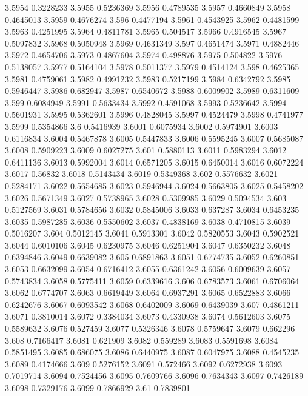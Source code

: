 3.5954  0.3228233
3.5955  0.5236369
3.5956  0.4789535
3.5957  0.4660849
3.5958  0.4645013
3.5959  0.4676274
3.596  0.4477194
3.5961  0.4543925
3.5962  0.4481599
3.5963  0.4251995
3.5964  0.4811781
3.5965  0.504517
3.5966  0.4916545
3.5967  0.5097832
3.5968  0.5050948
3.5969  0.4631349
3.597  0.4651474
3.5971  0.4882446
3.5972  0.4654706
3.5973  0.4867604
3.5974  0.498876
3.5975  0.504822
3.5976  0.5138057
3.5977  0.5164104
3.5978  0.5011377
3.5979  0.4514124
3.598  0.4625365
3.5981  0.4759061
3.5982  0.4991232
3.5983  0.5217199
3.5984  0.6342792
3.5985  0.5946447
3.5986  0.682947
3.5987  0.6540672
3.5988  0.6009902
3.5989  0.6311609
3.599  0.6084949
3.5991  0.5633434
3.5992  0.4591068
3.5993  0.5236642
3.5994  0.5601931
3.5995  0.5362601
3.5996  0.4828045
3.5997  0.4524479
3.5998  0.4741977
3.5999  0.5354866
3.6  0.5416939
3.6001  0.6075934
3.6002  0.5974901
3.6003  0.6116834
3.6004  0.5467878
3.6005  0.5447833
3.6006  0.5595245
3.6007  0.5685087
3.6008  0.5909223
3.6009  0.6027275
3.601  0.5880113
3.6011  0.5983294
3.6012  0.6411136
3.6013  0.5992004
3.6014  0.6571205
3.6015  0.6450014
3.6016  0.6072224
3.6017  0.56832
3.6018  0.5143434
3.6019  0.5349368
3.602  0.5576632
3.6021  0.5284171
3.6022  0.5654685
3.6023  0.5946944
3.6024  0.5663805
3.6025  0.5458202
3.6026  0.5671349
3.6027  0.5738965
3.6028  0.5309985
3.6029  0.5094534
3.603  0.5127569
3.6031  0.5784656
3.6032  0.5845006
3.6033  0.637287
3.6034  0.6453235
3.6035  0.5987285
3.6036  0.5550602
3.6037  0.4838169
3.6038  0.4710815
3.6039  0.5016207
3.604  0.5012145
3.6041  0.5913301
3.6042  0.5820553
3.6043  0.5902521
3.6044  0.6010106
3.6045  0.6230975
3.6046  0.6251904
3.6047  0.6350232
3.6048  0.6394846
3.6049  0.6639082
3.605  0.6891863
3.6051  0.6774735
3.6052  0.6260851
3.6053  0.6632099
3.6054  0.6716412
3.6055  0.6361242
3.6056  0.6009639
3.6057  0.5743834
3.6058  0.5775411
3.6059  0.6339616
3.606  0.6783573
3.6061  0.6706064
3.6062  0.6774707
3.6063  0.6619449
3.6064  0.6937291
3.6065  0.6522883
3.6066  0.6242676
3.6067  0.6093542
3.6068  0.6402009
3.6069  0.6439039
3.607  0.4861211
3.6071  0.3810014
3.6072  0.3384034
3.6073  0.4330938
3.6074  0.5612603
3.6075  0.5589632
3.6076  0.527459
3.6077  0.5326346
3.6078  0.5759647
3.6079  0.662296
3.608  0.7166417
3.6081  0.621909
3.6082  0.559289
3.6083  0.5591698
3.6084  0.5851495
3.6085  0.686075
3.6086  0.6440975
3.6087  0.6047975
3.6088  0.4545235
3.6089  0.4174666
3.609  0.5276152
3.6091  0.572466
3.6092  0.6272938
3.6093  0.7019714
3.6094  0.7524456
3.6095  0.7609766
3.6096  0.7634343
3.6097  0.7426189
3.6098  0.7329176
3.6099  0.7866929
3.61  0.7839801
